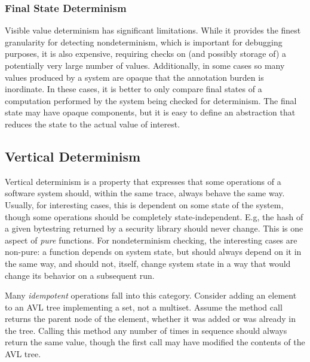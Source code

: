 \subsubsection{Final State Determinism}

Visible value determinism has significant limitations.  While it
provides the finest granularity for detecting nondeterminism, which is
important for debugging purposes, it is also expensive, requiring
checks on (and possibly storage of) a potentially very large number of
values.  Additionally, in some cases so many values produced by a
system are opaque that the annotation burden is inordinate.  In these
cases, it is better to only compare final states of a computation
performed by the system being checked for determinism.  The final
state may have opaque components, but it is easy to define an
abstraction that reduces the state to the actual value of interest.



\subsection{Vertical Determinism}

Vertical determinism is a property that expresses that some operations
of a software system should, within the same trace, always behave the
same way.  Usually, for interesting cases, this is dependent on some
state of the system, though some operations should be completely
state-independent.  E.g, the hash of a given bytestring returned by a
security library should never change.  This is one aspect of
\emph{pure} functions.  For nondeterminism checking, the interesting
cases are non-pure: a function depends on system state, but should
always depend on it in the same way, and should not, itself, change
system state in a way that would change its behavior on a subsequent
run.

Many \emph{idempotent} operations fall into this category.
Consider adding an element to an AVL tree implementing a set, not a
multiset.  Assume the method call returns the parent node of the
element, whether it was added or was already in the tree.  Calling
this method any number of times in sequence should always return the
same value, though the first call may have modified the contents of
the AVL tree.

